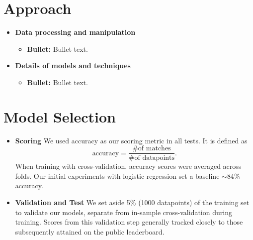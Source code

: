 \section{Approach}
\medskip
\begin{itemize}
	
	\item \textbf{Data processing and manipulation}
	\begin{itemize}
		\item \textbf{Bullet:} Bullet text.
	\end{itemize}
	
	\item \textbf{Details of models and techniques}
	\begin{itemize}
		\item \textbf{Bullet:} Bullet text.
		
		
	\end{itemize}
	
\end{itemize}



\section{Model Selection}
\medskip
\begin{itemize}
	
	\item \textbf{Scoring} 
	We used accuracy as our scoring metric in all tests. It is defined as
	$$
	\text{accuracy}=\frac{\text{\# of matches}}{\text{\# of datapoints}}.
	$$
	When training with cross-validation, accuracy scores were averaged across folds. Our initial experiments with logistic regression set a baseline $\sim 84$\% accuracy. 
	\item \textbf{Validation and Test} 
	We set aside 5\% (1000 datapoints) of the training set to validate our models, separate from in-sample cross-validation during training. Scores from this validation step generally tracked closely to those subsequently attained on the public leaderboard. 
	
\end{itemize}



